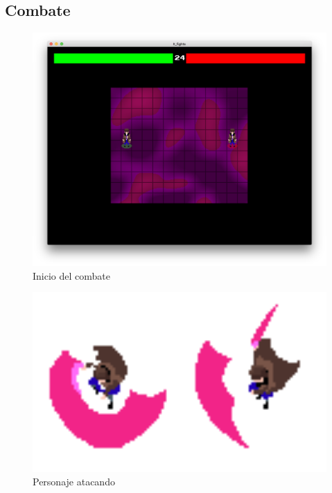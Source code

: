 \subsection{Combate}

\begin{figure}[h]
	\centerline{\includegraphics[width=17cm]{otros/manual/pelea1.png}}
	\caption{Inicio del combate}
	\label{uso:pelea1}
\end{figure}


\begin{figure}[h]
	\centerline{\includegraphics[width=14cm]{otros/manual/atacando1.png}}
	\caption{Personaje atacando}
	\label{uso:ataque}
\end{figure}


